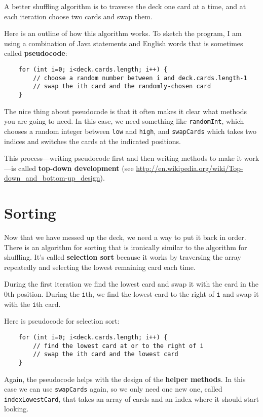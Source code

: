 \documentclass[12pt]{book}
\theoremstyle{definition}
\begin{document}
A better shuffling algorithm is to traverse the deck one card at a
time, and at each iteration choose two cards and swap them.

Here is an outline of how this algorithm works.  To sketch the
program, I am using a combination of Java statements and English
words that is sometimes called {\bf pseudocode}:  

\begin{lstlisting}
    for (int i=0; i<deck.cards.length; i++) {
        // choose a random number between i and deck.cards.length-1
        // swap the ith card and the randomly-chosen card
    }
\end{lstlisting}
%
The nice thing about pseudocode is that it often makes it
clear what methods you are going to need.  In this case, we
need something like {\tt randomInt}, which chooses a random
integer between {\tt low} and {\tt high},
and {\tt swapCards} which takes two indices and switches the
cards at the indicated positions.

This process---writing pseudocode first and then writing
methods to make it work---is called {\bf top-down development}
(see \url{http://en.wikipedia.org/wiki/Top-down_and_bottom-up_design}).


\section{Sorting}
\label{sorting}

Now that we have messed up the deck, we need a way to put it back in
order.  There is an algorithm for sorting that is ironically similar
to the algorithm for shuffling.  It's called {\bf selection sort}
because it works by traversing the array repeatedly and selecting the
lowest remaining card each time.

During the first iteration we find the lowest card and swap
it with the card in the 0th position.  During the {\tt i}th, we find the
lowest card to the right of {\tt i} and swap it with the {\tt i}th
card.

Here is pseudocode for selection sort:

\begin{lstlisting}
    for (int i=0; i<deck.cards.length; i++) {
        // find the lowest card at or to the right of i
        // swap the ith card and the lowest card
    }
\end{lstlisting}
%
Again, the pseudocode helps with the design of the {\bf helper
methods}.  In this case we can use {\tt swapCards} again,
so we only need one new one, called {\tt indexLowestCard},
that takes an array of cards and an index where it should
start looking.
\end{document}
